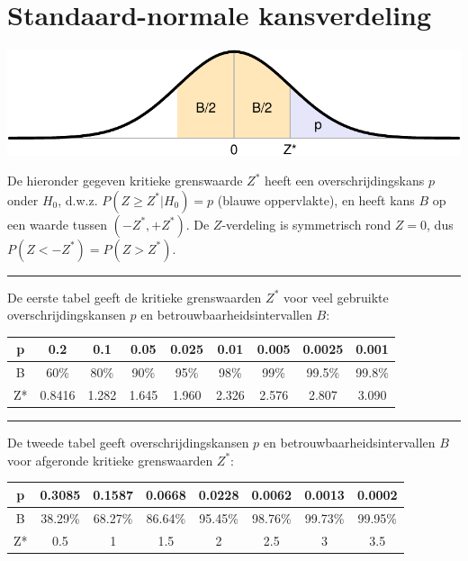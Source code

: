 \documentclass[
]{book}
\begin{document}
\hypertarget{app:kritiekeZwaarden}{%
\chapter{Standaard-normale kansverdeling}\label{app:kritiekeZwaarden}}

\includegraphics{KMS-NL_files/figure-latex/kritiekeZwaarden-hulpfiguur-1.pdf}

De hieronder gegeven kritieke grenswaarde \(Z^*\) heeft een overschrijdingskans \(p\) onder \(H_0\),
d.w.z. \(P(Z \geq Z^*|H_0)=p\) (blauwe oppervlakte),
en heeft kans \(B\) op een waarde tussen \((-Z^*, +Z^*)\).
De \(Z\)-verdeling is symmetrisch rond \(Z=0\), dus \(P(Z < -Z^*) = P(Z > Z^*)\).

\begin{center}\rule{0.5\linewidth}{0.5pt}\end{center}

De eerste tabel geeft de kritieke grenswaarden \(Z^*\) voor veel gebruikte overschrijdingskansen \(p\) en betrouwbaarheidsintervallen \(B\):

\begin{tabular}{ccccccccc}
\toprule
p & 0.2 & 0.1 & 0.05 & 0.025 & 0.01 & 0.005 & 0.0025 & 0.001\\
\midrule
B & 60\% & 80\% & 90\% & 95\% & 98\% & 99\% & 99.5\% & 99.8\%\\
Z* & 0.8416 & 1.282 & 1.645 & 1.960 & 2.326 & 2.576 & 2.807 & 3.090\\
\bottomrule
\end{tabular}

\begin{center}\rule{0.5\linewidth}{0.5pt}\end{center}

De tweede tabel geeft overschrijdingskansen \(p\) en betrouwbaarheidsintervallen \(B\) voor afgeronde kritieke grenswaarden \(Z^*\):

\begin{tabular}{cccccccc}
\toprule
p & 0.3085 & 0.1587 & 0.0668 & 0.0228 & 0.0062 & 0.0013 & 0.0002\\
\midrule
B & 38.29\% & 68.27\% & 86.64\% & 95.45\% & 98.76\% & 99.73\% & 99.95\%\\
Z* & 0.5 & 1 & 1.5 & 2 & 2.5 & 3 & 3.5\\
\bottomrule
\end{tabular}
\end{document}
